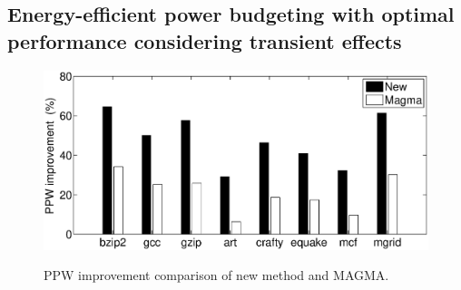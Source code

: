 \subsection{Energy-efficient power budgeting with optimal performance considering transient effects}





\begin{figure}
\centering
\includegraphics[width=1\linewidth]{fig/transient_ppw.eps}\label{fig:transient_ppw_spec}
\caption{PPW improvement comparison of new method and MAGMA.}
\end{figure}




